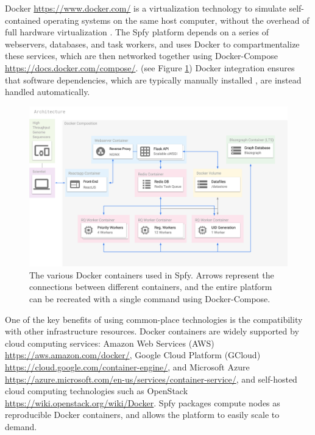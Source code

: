 \documentclass{article}
\begin{document}
Docker \url{https://www.docker.com/} is a virtualization technology to simulate self-contained operating systems on the same host computer, without the overhead of full hardware virtualization \cite{felter2015updated}.
The Spfy platform depends on a series of webservers, databases, and task workers, and uses Docker to compartmentalize these services, which are then networked together using Docker-Compose \url{https://docs.docker.com/compose/}.
(see Figure \ref{fig-docker})
Docker integration ensures that software dependencies, which are typically manually installed \cite{doi:10.1093/bioinformatics/btu153,laing2010pan,inouye2014srst2,naccache2014cloud}, are instead handled automatically.

\begin{figure}[!hb]
\begin{center}
\includegraphics[width=\textwidth]{images/docker}
\end{center}
\caption{The various Docker containers used in Spfy. Arrows represent the connections between different containers, and the entire platform can be recreated with a single command using Docker-Compose.}
\label{fig-docker}
\end{figure}

One of the key benefits of using common-place technologies is the compatibility with other infrastructure resources.
Docker containers are widely supported by cloud computing services: Amazon Web Services (AWS) \url{https://aws.amazon.com/docker/}, Google Cloud Platform (GCloud) \url{https://cloud.google.com/container-engine/}, and Microsoft Azure \url{https://azure.microsoft.com/en-us/services/container-service/}, and self-hosted cloud computing technologies such as OpenStack \url{https://wiki.openstack.org/wiki/Docker}.
Spfy packages compute nodes as reproducible Docker containers, and allows the platform to easily scale to demand.
\end{document}
